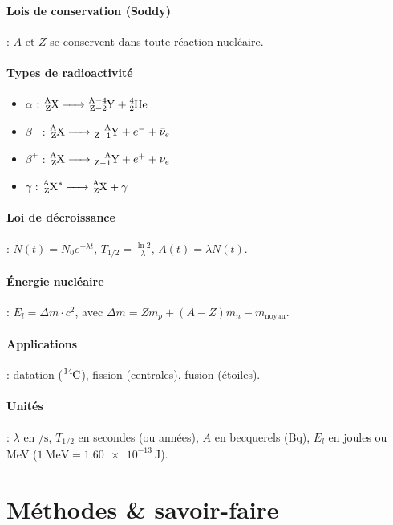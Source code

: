 \begin{synthese}
\paragraph{Lois de conservation (Soddy)} : $A$ et $Z$ se conservent dans toute réaction nucléaire.

\paragraph{Types de radioactivité}
\begin{itemize}
    \item $\alpha$ : $\ce{^{A}_{Z}X -> ^{A-4}_{Z-2}Y + ^{4}_{2}He}$
    \item $\beta^-$ : $\ce{^{A}_{Z}X -> ^{A}_{Z+1}Y} + e^- + \bar{\nu}_e$
    \item $\beta^+$ : $\ce{^{A}_{Z}X -> ^{A}_{Z-1}Y} + e^+ + \nu_e$
    \item $\gamma$ : $\ce{^{A}_{Z}X^* -> ^{A}_{Z}X} + \gamma$
\end{itemize}

\paragraph{Loi de décroissance} : $N(t) = N_0 e^{-\lambda t}$, $T_{1/2} = \frac{\ln 2}{\lambda}$, $A(t) = \lambda N(t)$.

\paragraph{Énergie nucléaire} : $E_l = \Delta m \cdot c^2$, avec $\Delta m = Z m_p + (A-Z) m_n - m_{\text{noyau}}$.

\paragraph{Applications} : datation ($\ce{^{14}C}$), fission (centrales), fusion (étoiles).

\paragraph{Unités} : $\lambda$ en $\si{\per\second}$, $T_{1/2}$ en secondes (ou années), $A$ en becquerels ($\si{\becquerel}$), $E_l$ en joules ou MeV ($\SI{1}{\MeV} = \SI{1.60e-13}{\joule}$).
\end{synthese}

\section{Méthodes \& savoir-faire}

